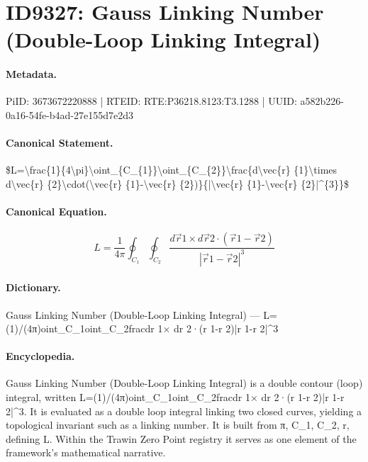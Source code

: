 \section*{ID9327: Gauss Linking Number (Double-Loop Linking Integral)}
\paragraph{Metadata.}
PiID: 3673672220888 | RTEID: RTE:P36218.8123:T3.1288 | UUID: a582b226-0a16-54fe-b4ad-27e155d7e2d3

\paragraph{Canonical Statement.}
\$L=\textbackslash{}frac\{1\}\{4\textbackslash{}pi\}\textbackslash{}oint\_\{C\_\{1\}\}\textbackslash{}oint\_\{C\_\{2\}\}\textbackslash{}frac\{d\textbackslash{}vec\{r\} \{1\}\textbackslash{}times d\textbackslash{}vec\{r\} \{2\}\textbackslash{}cdot(\textbackslash{}vec\{r\} \{1\}-\textbackslash{}vec\{r\} \{2\})\}\{|\textbackslash{}vec\{r\} \{1\}-\textbackslash{}vec\{r\} \{2\}|\textasciicircum{}\{3\}\}\$

\paragraph{Canonical Equation.}
\[
L=\frac{1}{4\pi}\oint_{C_{1}}\oint_{C_{2}}\frac{d\vec{r} {1}\times d\vec{r} {2}\cdot(\vec{r} {1}-\vec{r} {2})}{|\vec{r} {1}-\vec{r} {2}|^{3}}
\]

\paragraph{Dictionary.}
Gauss Linking Number (Double-Loop Linking Integral) — L=(1)/(4π)oint\_C\_1oint\_C\_2fracdr 1× dr 2·(r 1-r 2)|r 1-r 2|\textasciicircum{}3

\paragraph{Encyclopedia.}
Gauss Linking Number (Double-Loop Linking Integral) is a double contour (loop) integral, written L=(1)/(4π)oint\_C\_1oint\_C\_2fracdr 1× dr 2·(r 1-r 2)|r 1-r 2|\textasciicircum{}3. It is evaluated as a double loop integral linking two closed curves, yielding a topological invariant such as a linking number. It is built from π, C\_1, C\_2, r, defining L. Within the Trawin Zero Point registry it serves as one element of the framework's mathematical narrative.
